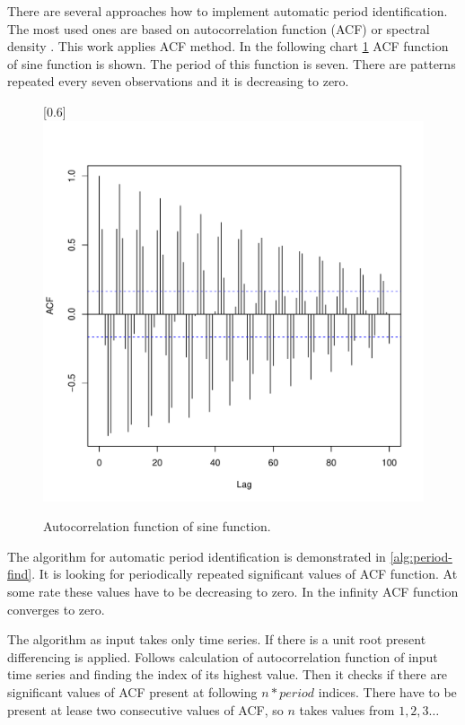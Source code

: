     There are several approaches how to implement automatic period identification. The most used ones are based on
    autocorrelation function (ACF) or spectral density \cite{period-hydman}. This work applies ACF method.
    In the following chart \ref{img:period-acf} ACF function of sine function is shown. The period of this
    function is seven. There are patterns repeated every seven observations and it is decreasing to zero.

    \begin{figure}[H]
        \begin{center}
            \scalebox{0.73}[0.6]{\includegraphics{img/acf-sine.pdf}}
            \caption{Autocorrelation function of sine function.}
            \label{img:period-acf}
        \end{center}
    \end{figure}

    The algorithm for automatic period identification is demonstrated in \ref{alg:period-find}.
    It is looking for periodically repeated significant values of ACF function. At some rate these values have to
    be decreasing to zero. In the infinity ACF function converges to zero.

    The algorithm as input takes only time series. If there is a unit root present differencing is applied.
    Follows calculation of autocorrelation function of input time series and finding the index of its highest
    value. Then it checks if there are significant values of ACF present at following $n*period$ indices.
    There have to be present at lease two consecutive values of ACF, so $n$ takes values from $1,2,3\dots$

